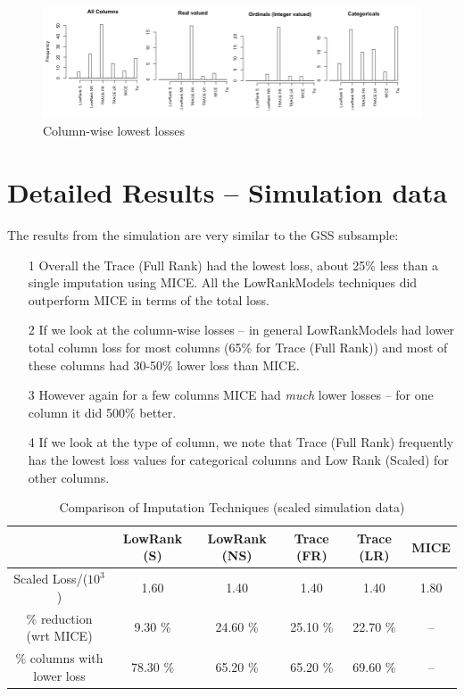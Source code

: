 \documentclass[11pt]{article} %
\begin{document}
\begin{figure}[H]
\caption*{Column-wise lowest losses}
\includegraphics[width = 1.2\textwidth]{ColumnSelect_GSS.png}
\end{figure}


\newpage

\section*{Detailed Results -- Simulation data}

The results from the simulation are very similar to the GSS subsample:
\begin{itemize}
\item[1] Overall the Trace (Full Rank) had the lowest loss, about 25\% less than a single imputation using MICE. All the LowRankModels techniques did outperform MICE in terms of the total loss.
\item[2] If we look at the column-wise losses -- in general LowRankModels had lower total column loss for most columns (65\% for Trace (Full Rank)) and most of these columns had 30-50\% lower loss than MICE.
\item[3] However again for a few columns MICE had \textit{much} lower losses -- for one column it did 500\% better. 
\item[4] If we look at the type of column, we note that Trace (Full Rank) frequently has the lowest loss values for categorical columns and Low Rank (Scaled) for other columns.
\end{itemize}


\begin{table}[H]
\caption*{Comparison of Imputation Techniques (scaled simulation data)} 
\centering
\begin{tabular}{|c|c|c|c|c|c|}
  \hline
 & LowRank (S) & LowRank (NS) & Trace (FR) & Trace (LR) & MICE \\ 
  \hline
Scaled Loss/($10^3$) & 1.60 & 1.40 & 1.40 & 1.40 & 1.80 \\ 
  \% reduction (wrt MICE) & 9.30 \% & 24.60 \% & 25.10 \% & 22.70 \% & -- \\ 
  \% columns with lower loss & 78.30  \%& 65.20  \%& 65.20 \% & 69.60 \% & -- \\ 
   \hline
\end{tabular}
\end{table}
\end{document}
